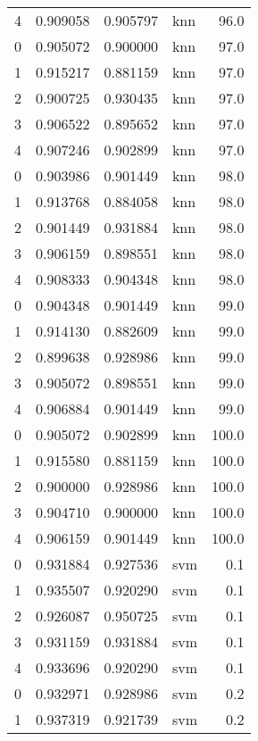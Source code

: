 \begin{tabular}{rrrlr}
     4 & 0.909058 & 0.905797 &      knn &       96.0 \\
     0 & 0.905072 & 0.900000 &      knn &       97.0 \\
     1 & 0.915217 & 0.881159 &      knn &       97.0 \\
     2 & 0.900725 & 0.930435 &      knn &       97.0 \\
     3 & 0.906522 & 0.895652 &      knn &       97.0 \\
     4 & 0.907246 & 0.902899 &      knn &       97.0 \\
     0 & 0.903986 & 0.901449 &      knn &       98.0 \\
     1 & 0.913768 & 0.884058 &      knn &       98.0 \\
     2 & 0.901449 & 0.931884 &      knn &       98.0 \\
     3 & 0.906159 & 0.898551 &      knn &       98.0 \\
     4 & 0.908333 & 0.904348 &      knn &       98.0 \\
     0 & 0.904348 & 0.901449 &      knn &       99.0 \\
     1 & 0.914130 & 0.882609 &      knn &       99.0 \\
     2 & 0.899638 & 0.928986 &      knn &       99.0 \\
     3 & 0.905072 & 0.898551 &      knn &       99.0 \\
     4 & 0.906884 & 0.901449 &      knn &       99.0 \\
     0 & 0.905072 & 0.902899 &      knn &      100.0 \\
     1 & 0.915580 & 0.881159 &      knn &      100.0 \\
     2 & 0.900000 & 0.928986 &      knn &      100.0 \\
     3 & 0.904710 & 0.900000 &      knn &      100.0 \\
     4 & 0.906159 & 0.901449 &      knn &      100.0 \\
     0 & 0.931884 & 0.927536 &      svm &        0.1 \\
     1 & 0.935507 & 0.920290 &      svm &        0.1 \\
     2 & 0.926087 & 0.950725 &      svm &        0.1 \\
     3 & 0.931159 & 0.931884 &      svm &        0.1 \\
     4 & 0.933696 & 0.920290 &      svm &        0.1 \\
     0 & 0.932971 & 0.928986 &      svm &        0.2 \\
     1 & 0.937319 & 0.921739 &      svm &        0.2 \\

\end{tabular}

